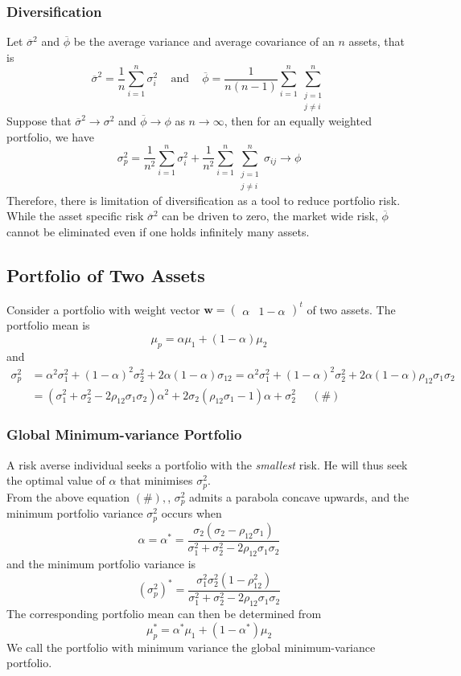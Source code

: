 \documentclass[12pt]{article}
\theoremstyle{definition}
\begin{document}
\subsubsection{Diversification}
Let $\overline{\sigma}^2$ and $\overline{\phi}$ be the average variance and average covariance of an $n$ assets, that is
\[
\overline{\sigma}^2 = \frac{1}{n}\sum_{i=1}^n\sigma_i^2\;\;\;\text{ and }\;\;\;\overline{\phi}=\frac{1}{n(n-1)}\sum_{i=1}^n\sum_{\substack{j=1\\j\neq i}}^n
\] 
Suppose that $\overline{\sigma}^2\to\sigma^2$ and $\overline{\phi}\to\phi$ as $n\to\infty$, then for an equally weighted portfolio, we have
\[
\sigma_p^2 = \frac{1}{n^2}\sum_{i=1}^n \sigma_i^2 +\frac{1}{n^2}\sum_{i=1}^n\sum_{\substack{j=1\\j\neq i}}^n \sigma_{ij}\to\phi
\]
Therefore, there is limitation of diversification as a tool to reduce portfolio risk.\\While the asset specific risk $\overline{\sigma}^2$ can be driven to zero, the market wide risk, $\overline{\phi}$ cannot be eliminated even if one holds infinitely many assets.
\subsection{Portfolio of Two Assets}
Consider a portfolio with weight vector $\mathbf{w} = \begin{pmatrix}\alpha&1-\alpha\end{pmatrix}^t$ of two assets. The portfolio mean is
\[
\mu_p = \alpha\mu_1+(1-\alpha)\mu_2
\]
and
\begin{align*}
\sigma_p^2 &= \alpha^2\sigma_1^2 +(1-\alpha)^2\sigma_2^2+2\alpha(1-\alpha)\sigma_{12} = \alpha^2\sigma_1^2 +(1-\alpha)^2\sigma_2^2+2\alpha(1-\alpha)\rho_{12}\sigma_1\sigma_2 \\
&=(\sigma_1^2+\sigma_2^2-2\rho_{12}\sigma_1\sigma_2)\alpha^2+2\sigma_2(\rho_{12}\sigma_1-1)\alpha+\sigma_2^2\;\;\;\;\;(\#)
\end{align*}
\subsubsection{Global Minimum-variance Portfolio}
A risk averse individual seeks a portfolio with the \textit{smallest} risk. He will thus seek the optimal value of $\alpha$ that minimises $\sigma_p^2$.\\From the above equation $(\#), $, $\sigma_p^2$ admits a parabola concave upwards, and the minimum portfolio variance $\sigma_p^2$ occurs when
\[
\alpha=\alpha^\ast = \frac{\sigma_2(\sigma_2-\rho_{12}\sigma_1)}{\sigma_1^2+\sigma_2^2-2\rho_{12}\sigma_1\sigma_2}
\]
and the minimum portfolio variance is
\[
(\sigma_p^2)^\ast = \frac{\sigma_1^2\sigma_2^2(1-\rho_{12}^2)}{\sigma_1^2+\sigma_2^2-2\rho_{12}\sigma_1\sigma_2}
\]
The corresponding portfolio mean can then be determined from
\[
\mu_p^\ast = \alpha^\ast\mu_1+(1-\alpha^\ast)\mu_2
\]
We call the portfolio with minimum variance the global minimum-variance portfolio.
\end{document}

